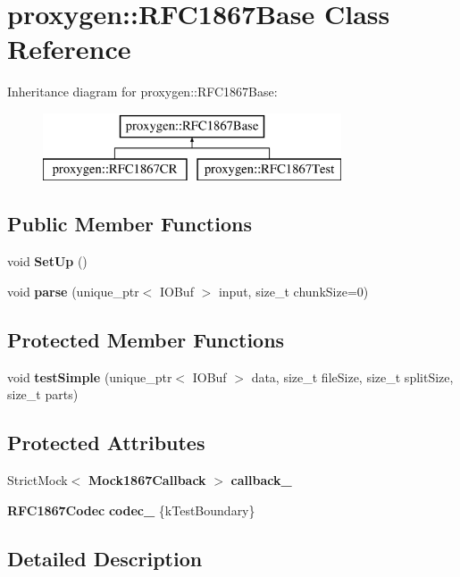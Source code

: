 \section{proxygen\+:\+:R\+F\+C1867\+Base Class Reference}
\label{classproxygen_1_1RFC1867Base}
Inheritance diagram for proxygen\+:\+:R\+F\+C1867\+Base\+:\begin{figure}[H]
\begin{center}
\leavevmode
\includegraphics[height=2.000000cm]{classproxygen_1_1RFC1867Base}
\end{center}
\end{figure}
\subsection*{Public Member Functions}
\begin{DoxyCompactItemize}
\item 
void {\bf Set\+Up} ()
\item 
void {\bf parse} (unique\+\_\+ptr$<$ I\+O\+Buf $>$ input, size\+\_\+t chunk\+Size=0)
\end{DoxyCompactItemize}
\subsection*{Protected Member Functions}
\begin{DoxyCompactItemize}
\item 
void {\bf test\+Simple} (unique\+\_\+ptr$<$ I\+O\+Buf $>$ data, size\+\_\+t file\+Size, size\+\_\+t split\+Size, size\+\_\+t parts)
\end{DoxyCompactItemize}
\subsection*{Protected Attributes}
\begin{DoxyCompactItemize}
\item 
Strict\+Mock$<$ {\bf Mock1867\+Callback} $>$ {\bf callback\+\_\+}
\item 
{\bf R\+F\+C1867\+Codec} {\bf codec\+\_\+} \{k\+Test\+Boundary\}
\end{DoxyCompactItemize}


\subsection{Detailed Description}


